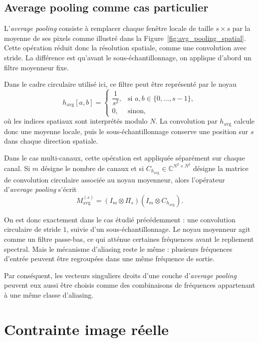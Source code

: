 \subsection{Average pooling comme cas particulier}

L'\textit{average pooling} consiste à remplacer chaque fenêtre locale de taille $s\times s$
par la moyenne de ses pixels comme illustré dans la Figure~\ref{fig:avg_pooling_spatial}. Cette opération réduit donc la résolution spatiale, comme une
convolution avec stride. La différence est qu'avant le sous-échantillonnage, on applique d'abord
un filtre moyenneur fixe.

Dans le cadre circulaire utilisé ici, ce filtre peut être représenté par le noyau
\[
    h_{\mathrm{avg}}[a,b]
    =
    \begin{cases}
        \dfrac{1}{s^2},
        & \text{si } a,b \in \{0,\dots,s-1\},\\[0.4em]
        0,
        & \text{sinon,}
    \end{cases}
\]
où les indices spatiaux sont interprétés modulo $N$. La convolution par
$h_{\mathrm{avg}}$ calcule donc une moyenne locale, puis le sous-échantillonnage conserve
une position sur $s$ dans chaque direction spatiale.

Dans le cas multi-canaux, cette opération est appliquée séparément sur chaque canal. Si $m$
désigne le nombre de canaux et si
$C_{h_{\mathrm{avg}}}\in\mathbb{C}^{N^2\times N^2}$ désigne la matrice de convolution circulaire
associée au noyau moyenneur, alors l'opérateur d'\textit{average pooling} s'écrit
\begin{equation}
    M_{\mathrm{avg}}^{(s)}
    =
    (I_m \otimes \Pi_s)
    (I_m \otimes C_{h_{\mathrm{avg}}}).
    \label{eq:average_pooling_convolution_sampling}
\end{equation}

On est donc exactement dans le cas étudié précédemment : une convolution circulaire de stride $1$,
suivie d'un sous-échantillonnage. Le noyau moyenneur agit comme un filtre passe-bas, ce qui atténue
certaines fréquences avant le repliement spectral. Mais le mécanisme d'aliasing reste le même :
plusieurs fréquences d'entrée peuvent être regroupées dans une même fréquence de sortie.

Par conséquent, les vecteurs singuliers droits d'une couche d'\textit{average pooling} peuvent eux aussi
être choisis comme des combinaisons de fréquences appartenant à une même classe d'aliasing.

\section{Contrainte image réelle}
\label{sec:contrainte-image-reelle}

